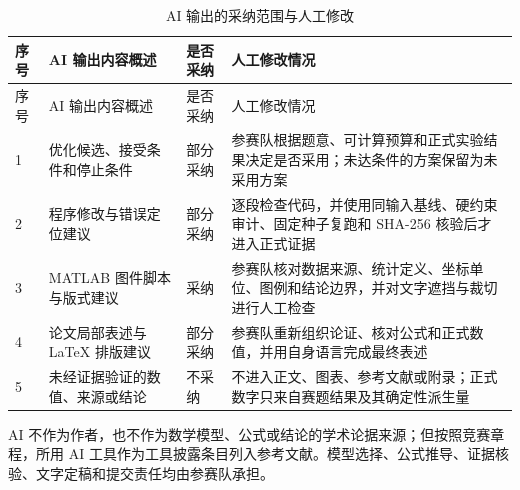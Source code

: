 {\footnotesize
\begin{longtable}{@{}p{}p{}>{\centering\arraybackslash}p{}p{}@{}}
\caption{AI 输出的采纳范围与人工修改}\label{tab:ai-adoption}\\
\toprule
序号 & AI 输出内容概述 & 是否采纳 & 人工修改情况 \\
\midrule
\endfirsthead
\toprule
序号 & AI 输出内容概述 & 是否采纳 & 人工修改情况 \\
\midrule
\endhead
1 & 优化候选、接受条件和停止条件 & 部分采纳 & 参赛队根据题意、可计算预算和正式实验结果决定是否采用；未达条件的方案保留为未采用方案 \\
2 & 程序修改与错误定位建议 & 部分采纳 & 逐段检查代码，并使用同输入基线、硬约束审计、固定种子复跑和 SHA-256 核验后才进入正式证据 \\
3 & MATLAB 图件脚本与版式建议 & 采纳 & 参赛队核对数据来源、统计定义、坐标单位、图例和结论边界，并对文字遮挡与裁切进行人工检查 \\
4 & 论文局部表述与 LaTeX 排版建议 & 部分采纳 & 参赛队重新组织论证、核对公式和正式数值，并用自身语言完成最终表述 \\
5 & 未经证据验证的数值、来源或结论 & 不采纳 & 不进入正文、图表、参考文献或附录；正式数字只来自赛题结果及其确定性派生量 \\
\bottomrule
\end{longtable}

AI 不作为作者，也不作为数学模型、公式或结论的学术论据来源；但按照竞赛章程，所用 AI 工具作为工具披露条目列入参考文献。模型选择、公式推导、证据核验、文字定稿和提交责任均由参赛队承担。
}
